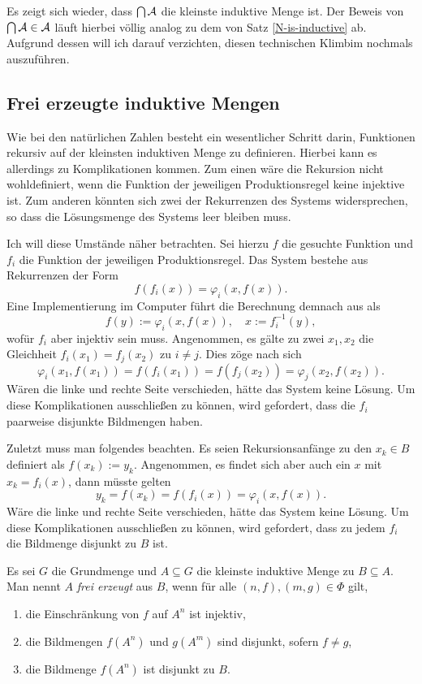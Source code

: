 Es zeigt sich wieder, dass $\bigcap\mathcal{A}$ die kleinste
induktive Menge ist. Der Beweis von $\bigcap\mathcal{A}\in\mathcal{A}$
läuft hierbei völlig analog zu dem von Satz \ref{N-is-inductive} ab.
Aufgrund dessen will ich darauf verzichten, diesen technischen Klimbim
nochmals auszuführen.

\subsection{Frei erzeugte induktive Mengen}

Wie bei den natürlichen Zahlen besteht ein wesentlicher Schritt darin,
Funktionen rekursiv auf der kleinsten induktiven Menge zu definieren.
Hierbei kann es allerdings zu Komplikationen kommen. Zum einen wäre
die Rekursion nicht wohldefiniert, wenn die Funktion der jeweiligen
Produktionsregel keine injektive ist. Zum anderen könnten sich zwei der
Rekurrenzen des Systems widersprechen, so dass die Lösungsmenge des
Systems leer bleiben muss.

Ich will diese Umstände näher betrachten. Sei hierzu $f$ die gesuchte
Funktion und $f_i$ die Funktion der jeweiligen Produktionsregel.
Das System bestehe aus Rekurrenzen der Form
\[f(f_i(x)) = \varphi_i(x, f(x)).\]
Eine Implementierung im Computer führt die Berechnung demnach aus als
\[f(y) := \varphi_i(x, f(x)),\quad x := f_i^{-1}(y),\]
wofür $f_i$ aber injektiv sein muss. Angenommen, es gälte zu zwei $x_1,x_2$
die Gleichheit $f_i(x_1)=f_j(x_2)$ zu $i\ne j$. Dies zöge nach sich
\[\varphi_i(x_1, f(x_1)) = f(f_i(x_1)) = f(f_j(x_2))  = \varphi_j(x_2, f(x_2)).\]
Wären die linke und rechte Seite verschieden, hätte das System keine
Lösung. Um diese Komplikationen ausschließen zu können, wird gefordert,
dass die $f_i$ paarweise disjunkte Bildmengen haben.

Zuletzt muss man folgendes beachten. Es seien Rekursionsanfänge
zu den $x_k\in B$ definiert als $f(x_k) := y_k$. Angenommen,
es findet sich aber auch ein $x$ mit $x_k = f_i(x)$, dann müsste gelten
\[y_k = f(x_k) = f(f_i(x)) = \varphi_i(x, f(x)).\]
Wäre die linke und rechte Seite verschieden, hätte das System keine
Lösung. Um diese Komplikationen ausschließen zu können, wird gefordert,
dass zu jedem $f_i$ die Bildmenge disjunkt zu $B$ ist.

\begin{Definition}\newlinefirst
Es sei $G$ die Grundmenge und $A\subseteq G$ die kleinste induktive
Menge zu $B\subseteq A$. Man nennt $A$ \emph{frei erzeugt} aus $B$,
wenn für alle $(n,f),(m,g)\in\Phi$ gilt,
\begin{enumerate}\setlength\itemsep{0em}
\item die Einschränkung von $f$ auf $A^n$ ist injektiv,
\item die Bildmengen $f(A^n)$ und $g(A^m)$ sind disjunkt, sofern $f\ne g$,
\item die Bildmenge $f(A^n)$ ist disjunkt zu $B$.
\end{enumerate}
\end{Definition}

